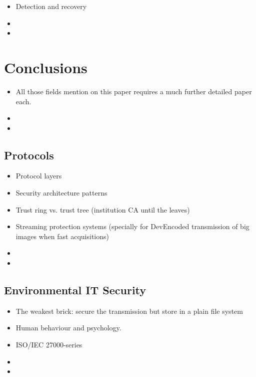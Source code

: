 \documentclass[10pt,a4paper,twoside]{llncs}
\begin{document}
\begin{itemize}
    \item Detection and recovery
    \item 
    \item 
\end{itemize}

%
\section{Conclusions \label{sec:conclusions}}

\begin{itemize}
    \item All those fields mention on this paper requires a much further detailed paper each.
    \item 
    \item
\end{itemize}

%
\subsection{Protocols \label{sec:protocols}}

\begin{itemize}
    \item Protocol layers \cite{Schneier:1995:ACP:572932}
    \item Security architecture patterns
    \item Trust ring vs. trust tree (institution CA until the leaves)
    \item Streaming protection systems (specially for DevEncoded transmission of big images when fast acquisitions)
    \item 
    \item 
\end{itemize}

%
\subsection{Environmental IT Security \label{sec:environment}}

\begin{itemize}
    \item The weakest brick: secure the transmission but store in a plain file system
    \item Human behaviour and psychology.
    \item ISO/IEC 27000-series
    \item 
    \item
\end{itemize}
\end{document}
